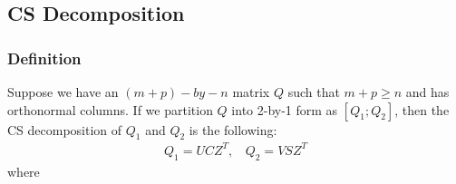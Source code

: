     
\newpage 
\subsection{CS Decomposition} \label{csd}

\subsubsection{Definition}
Suppose we have an $(m+p)-by-n$ matrix $Q$ such that $m+p \geq n$ and has orthonormal columns. If we partition $Q$ into 2-by-1 form as $[Q_1; Q_2]$, then the CS decomposition of $Q_1$ and $Q_2$ is the following:
\begin{align} \label{eq:csddef} 
Q_1 = UCZ^T,\ \  \ \ Q_2 = VSZ^T
\end{align}
where 
